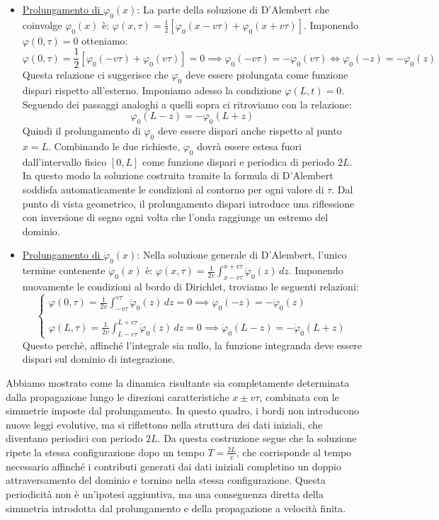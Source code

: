 \documentclass[a4paper,12pt]{report}
\begin{document}
\begin{itemize}
    \item \underline{Prolungamento di $\varphi_0(x)$}: La parte della soluzione di D'Alembert che coinvolge $\varphi_0(x)$ è: $\varphi(x,\tau)=\displaystyle\frac{1}{2}[\varphi_0(x-v\tau)+\varphi_0(x+v\tau)]$. Imponendo $\varphi(0,\tau)=0$ otteniamo:
    \[\varphi(0,\tau)=\frac{1}{2}[\varphi_0(-v\tau)+\varphi_0(v\tau)]=0\implies \varphi_0(-v\tau)=-\varphi_0(v\tau)\iff\varphi_0(-z)=-\varphi_0(z)\]
    Questa relazione ci suggerisce che $\varphi_0$ deve essere prolungata come funzione dispari rispetto all'esterno. Imponiamo adesso la condizione $\varphi(L,t)=0$. Seguendo dei passaggi analoghi a quelli sopra ci ritroviamo con la relazione:
    \[\varphi_0(L-z)=-\varphi_0(L+z)\]
    Quindi il prolungamento di $\varphi_0$ deve essere dispari anche rispetto al punto $x=L$. Combinando le due richieste, $\varphi_0$ dovrà essere estesa fuori dall’intervallo fisico $[0,L]$ come funzione dispari e periodica di periodo $2L$. In questo modo la soluzione costruita tramite la formula di D’Alembert soddisfa automaticamente le condizioni al contorno per ogni valore di $\tau$. Dal punto di vista geometrico, il prolungamento dispari introduce una riflessione con inversione di segno ogni volta che l’onda raggiunge un estremo del dominio.
    
    \item\underline{Prolungamento di $\dot{\varphi}_0(x)$}: Nella soluzione generale di D'Alembert, l'unico termine contenente $\dot{\varphi}_0(x)$ è: $\varphi(x,\tau)=\displaystyle\frac{1}{2v}\int_{x-v\tau}^{x+v\tau}\dot{\varphi}_0(z)\,dz$. Imponendo nuovamente le condizioni al bordo di Dirichlet, troviamo le seguenti relazioni:
    \[\begin{cases}\displaystyle\varphi(0,\tau)=\frac{1}{2v}\int_{-v\tau}^{v\tau}\dot{\varphi}_0(z)\,dz=0\implies\dot{\varphi}_0(-z)=-\dot{\varphi}_0(z)
    \\
    \\\displaystyle\varphi(L,\tau)=\frac{1}{2v}\int_{L-v\tau}^{L+v\tau}\dot{\varphi}_0(z)\,dz=0\implies\dot{\varphi}_0(L-z)=-\dot{\varphi}_0(L+z)
        \end{cases}\]
    Questo perchè, affinché l'integrale sia nullo, la funzione integranda deve essere dispari sul dominio di integrazione.


\end{itemize}
\vspace{1cm}
Abbiamo mostrato come la dinamica risultante sia completamente determinata dalla propagazione lungo le direzioni caratteristiche $x\pm v\tau$, combinata con le simmetrie imposte dal prolungamento. In questo quadro, i bordi non introducono nuove leggi evolutive, ma si riflettono nella struttura dei dati iniziali, che diventano periodici con periodo $2L$. Da questa costruzione segue che la soluzione ripete la stessa configurazione dopo un tempo $T=\displaystyle\frac{2L}{v}$, che corrisponde al tempo necessario affinché i contributi generati dai dati iniziali completino un doppio attraversamento del dominio e tornino nella stessa configurazione. Questa periodicità non è un’ipotesi aggiuntiva, ma una conseguenza diretta della simmetria introdotta dal prolungamento e della propagazione a velocità finita.
\end{document}
